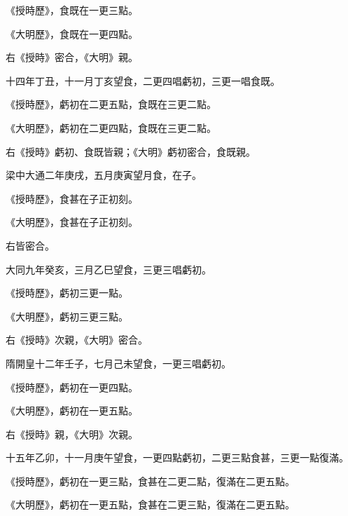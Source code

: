 \begin{pinyinscope}
 《授時歷》，食既在一更三點。



 《大明歷》，食既在一更四點。



 右《授時》密合，《大明》親。



 十四年丁丑，十一月丁亥望食，二更四唱虧初，三更一唱食既。



 《授時歷》，虧初在二更五點，食既在三更二點。



 《大明歷》，虧初在二更四點，食既在三更二點。



 右《授時》虧初、食既皆親；《大明》虧初密合，食既親。



 梁中大通二年庚戌，五月庚寅望月食，在子。



 《授時歷》，食甚在子正初刻。



 《大明歷》，食甚在子正初刻。



 右皆密合。



 大同九年癸亥，三月乙巳望食，三更三唱虧初。



 《授時歷》，虧初三更一點。



 《大明歷》，虧初三更三點。



 右《授時》次親，《大明》密合。



 隋開皇十二年壬子，七月己未望食，一更三唱虧初。



 《授時歷》，虧初在一更四點。



 《大明歷》，虧初在一更五點。



 右《授時》親，《大明》次親。



 十五年乙卯，十一月庚午望食，一更四點虧初，二更三點食甚，三更一點復滿。



 《授時歷》，虧初在一更三點，食甚在二更二點，復滿在二更五點。



 《大明歷》，虧初在一更五點，食甚在二更三點，復滿在二更五點。




\end{pinyinscope}
